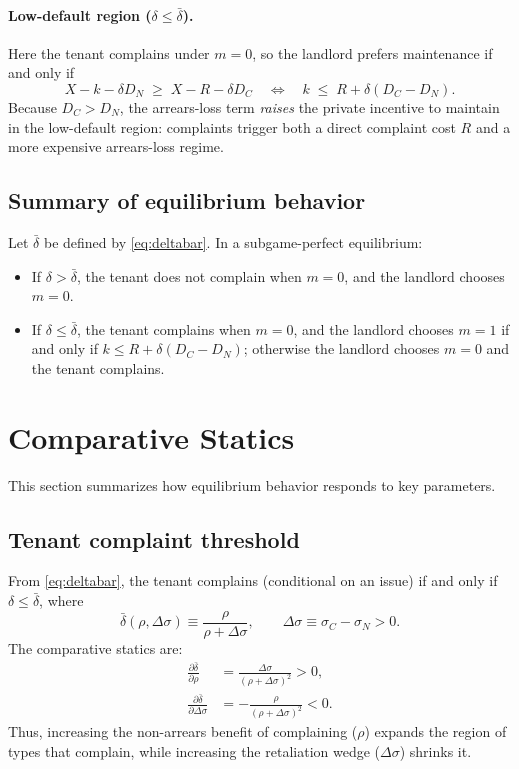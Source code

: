 \documentclass[11pt]{article}
\begin{document}
\paragraph{Low-default region ($\delta \le \bar\delta$).}
Here the tenant complains under $m=0$, so the landlord prefers maintenance if and only if
\[
  X - k - \delta D_N \;\ge\; X - R - \delta D_C
  \quad \Longleftrightarrow \quad
  k \;\le\; R + \delta (D_C - D_N).
\]
Because $D_C>D_N$, the arrears-loss term \emph{raises} the private incentive to maintain in the low-default region: complaints trigger both a direct complaint cost $R$ and a more expensive arrears-loss regime.

\subsection{Summary of equilibrium behavior}

Let $\bar\delta$ be defined by \eqref{eq:deltabar}. In a subgame-perfect equilibrium:
\begin{itemize}
  \item If $\delta > \bar\delta$, the tenant does not complain when $m=0$, and the landlord chooses $m=0$.
  \item If $\delta \le \bar\delta$, the tenant complains when $m=0$, and the landlord chooses $m=1$ if and only if $k \le R + \delta(D_C-D_N)$; otherwise the landlord chooses $m=0$ and the tenant complains.
\end{itemize}

\section{Comparative Statics}

This section summarizes how equilibrium behavior responds to key parameters.

\subsection{Tenant complaint threshold}

From \eqref{eq:deltabar}, the tenant complains (conditional on an issue) if and only if $\delta \le \bar\delta$, where
\[
  \bar\delta(\rho,\Delta\sigma) \equiv \frac{\rho}{\rho + \Delta\sigma},
  \qquad \Delta\sigma \equiv \sigma_C - \sigma_N > 0.
\]
The comparative statics are:
\begin{align}
  \frac{\partial \bar\delta}{\partial \rho}
  &= \frac{\Delta\sigma}{(\rho+\Delta\sigma)^2} > 0, \\
  \frac{\partial \bar\delta}{\partial \Delta\sigma}
  &= -\frac{\rho}{(\rho+\Delta\sigma)^2} < 0.
\end{align}
Thus, increasing the non-arrears benefit of complaining ($\rho$) expands the region of types that complain, while increasing the retaliation wedge ($\Delta\sigma$) shrinks it.
\end{document}
